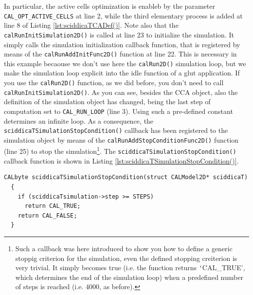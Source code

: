 In particular, the active cells optimization is enableb by the
parameter \verb'CAL_OPT_ACTIVE_CELLS' at line 2, while the third
elementary process is added at line 8 of Listing
\ref{lst:sciddicaTCADef()}. Note also that the
\verb'calRunInitSimulation2D()' is called at line 23 to initialize the
simulation. It simply calls the simulation initialization callback
function, that is registered by means of the
\verb'calRunAddInitFunc2D()' function at line 22. This is necessary in
this example becaouse we don't use here the \verb'calRun2D()'
simulation loop, but we make the simulation loop explicit into the
idle function of a glut application. If you use the \verb'calRun2D()'
function, as we did before, you don't need to call
\verb'calRunInitSimulation2D()'. As you can see, besides the CCA
object, also the definition of the simulation object has changed,
being the last step of computation set to \verb'CAL_RUN_LOOP' (line
3). Using such a pre-defined constant determines an infinite loop. As
a consequence, the \verb'sciddicaTSimulationStopCondition()' callback
has been registered to the simulation object by means of the
\verb'calRunAddStopConditionFunc2D()' function (line 25) to stop the
simulation\footnote{Such a callback was here introduced to show you
  how to define a generic stoppig criterion for the simulation, even
  the defined stopping creiterion is very trivial. It simply becomes
  true (i.e. the function returns \texttt'CAL\_TRUE', which determines
  the end of the simulation loop) when a predefined number of steps is
  reached (i.e. 4000, as before).}. The
\verb'sciddicaTSimulationStopCondition()' callback function is shown
in Listing \ref{lst:sciddicaTSimulationStopCondition()}.


\begin{lstlisting}[float,floatplacement=H, label=lst:sciddicaTSimulationStopCondition(), caption=The sciddicaTSimulationStopCondition() callback function defining the simulation stopping criterion for the SciddicaT optimized model.]
  CALbyte sciddicaTSimulationStopCondition(struct CALModel2D* sciddicaT)
  {
    if (sciddicaTsimulation->step >= STEPS)
      return CAL_TRUE;
    return CAL_FALSE;
  }
\end{lstlisting}


